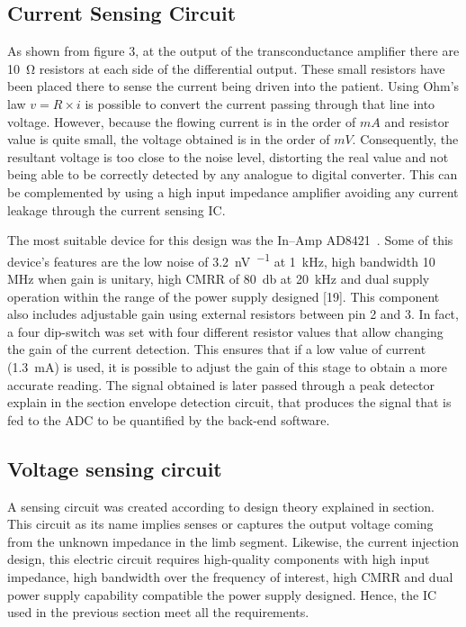 \subsection{Current Sensing Circuit}
As shown from figure 3, at the output of the transconductance amplifier there are \SI{10}{\ohm} resistors at each side of the differential output. These small resistors have been placed there to sense the current being driven into the patient. Using Ohm's law $v=R \times i$ is possible to convert the current passing through that line into voltage. However, because the flowing current is in the order of $mA$ and resistor value is quite small, the voltage obtained is in the order of $mV$. Consequently, the resultant voltage is too close to the noise level, distorting the real value and not being able to be correctly detected by any analogue to digital converter. This can be complemented by using a high input impedance amplifier avoiding any current leakage through the current sensing IC.  

The most suitable device for this design was the In–Amp AD8421~\cite{ad:AD8421}. Some of this device's features are the low noise of \SI{3.2}{\nano\volt\per{}} at \SI{1}{\kHz}, high bandwidth 10 MHz when gain is unitary, high CMRR of \SI{80}{\decibel} at \SI{20}{\kHz} and dual supply operation within the range of the power supply designed [19]. This component also includes adjustable gain using external resistors between pin 2 and 3. In fact, a four dip-switch was set with four different resistor values that allow changing the gain of the current detection. This ensures that if a low value of current (\SI{1.3}{\mA}) is used, it is possible to adjust the gain of this stage to obtain a more accurate reading. The signal obtained is later passed through a peak detector explain in the section envelope detection circuit, that produces the signal that is fed to the ADC to be quantified by the back-end software. 

\subsection{Voltage sensing circuit}
A sensing circuit was created according to design theory explained in section. This circuit as its name implies senses or captures the output voltage coming from the unknown impedance in the limb segment. Likewise, the current injection design, this electric circuit requires high-quality components with high input impedance, high bandwidth over the frequency of interest, high CMRR and dual power supply capability compatible the power supply designed. Hence, the IC used in the previous section meet all the requirements. 


